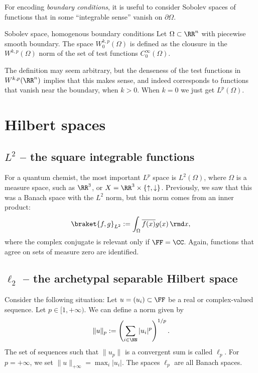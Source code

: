 For encoding \emph{boundary conditions}, it is useful to consider Sobolev spaces of functions that in some ``integrable sense'' vanish on $\partial \Omega$.
\begin{myDefinition}{Sobolev space, homogenous boundary conditions}{}
Let $\Omega\subset \RR^n$ with piecewise smooth boundary. The space $W^{k,p}_0(\Omega)$ is defined as the clousure in the $W^{k,p}(\Omega)$ norm of the set of test functions $C^\infty_0(\Omega)$.
\end{myDefinition}
The definition may seem arbitrary, but the denseness of the test functions in $W^{k,p}(\RR^n)$ implies that this makes sense, and indeed corresponds to functions that vanish near the boundary, when $k>0$. When $k=0$ we just get $L^p(\Omega)$.

\section{Hilbert spaces}

\subsection{$L^2$ -- the square integrable functions}

For a quantum chemist, the most important $L^p$ space is $L^2(\Omega)$, where $\Omega$ is a measure space, such as $\RR^3$, or $X = \RR^3 \times \{\uparrow,\downarrow\}$. Previously, we saw that this was a Banach space with the $L^2$ norm, but this norm comes from an inner product:
\begin{equation}
    \braket{f,g}_{L^2} := \int_\Omega \overline{f(x)} g(x) \, \rmd x,
\end{equation}
where the complex conjugate is relevant only if $\FF = \CC$. Again, functions that agree on sets of measure zero are identified.

\subsection{$\ell_2$ -- the archetypal separable Hilbert space}

Consider the following situation: Let $u = (u_i) \subset \FF$ be a real or complex-valued sequence. Let $p \in [1,+\infty)$. We can define a norm given by
\begin{equation}
    \|u\|_p := \left(\sum_{i\in\NN} |u_i|^p \right)^{1/p}.
\end{equation}
The set of sequences such that $\|u_p\|$ is a convergent sum is called $\ell_p$. For $p=+\infty$, we set $\|u\|_{+\infty} = \max_i |u_i|$. The spaces $\ell_p$ are all Banach spaces.

